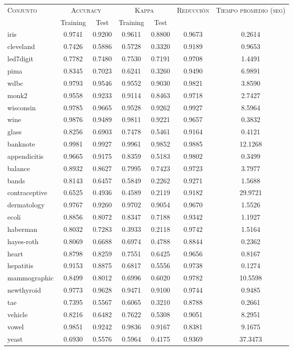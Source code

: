 \begin{table}[]
\centering
\begin{tabular}{l c c c c c c}
\hline
\multirow{2}{*}{\textsc{Conjunto}}
	& \multicolumn{2}{c}{\textsc{Accuracy}}
	& \multicolumn{2}{c}{\textsc{Kappa}}
	& \textsc{Reducción}
	& \textsc{Tiempo promedio (seg)} \\
	& Training & Test
	& Training & Test \\ 
\hline
\hline

iris & 0.9741 & 0.9200 & 0.9611 & 0.8800 & 0.9673 & 0.2614 \\
cleveland & 0.7426 & 0.5886 & 0.5728 & 0.3320 & 0.9189 & 0.9653 \\
led7digit & 0.7782 & 0.7480 & 0.7530 & 0.7191 & 0.9708 & 1.4491 \\
pima & 0.8345 & 0.7023 & 0.6241 & 0.3260 & 0.9490 & 6.9891 \\
wdbc & 0.9793 & 0.9546 & 0.9552 & 0.9030 & 0.9821 & 3.8590 \\
monk2 & 0.9558 & 0.9233 & 0.9114 & 0.8463 & 0.9718 & 2.7427 \\
wisconsin & 0.9785 & 0.9665 & 0.9528 & 0.9262 & 0.9927 & 8.5964 \\
wine & 0.9876 & 0.9489 & 0.9811 & 0.9221 & 0.9657 & 0.3832 \\
glass & 0.8256 & 0.6903 & 0.7478 & 0.5461 & 0.9164 & 0.4121 \\
banknote & 0.9981 & 0.9927 & 0.9961 & 0.9852 & 0.9885 & 12.1268 \\
appendicitis & 0.9665 & 0.9175 & 0.8359 & 0.5183 & 0.9802 & 0.3499 \\
balance & 0.8932 & 0.8627 & 0.7995 & 0.7423 & 0.9723 & 3.7977 \\
bands & 0.8143 & 0.6457 & 0.5849 & 0.2262 & 0.9271 & 1.5688 \\
contraceptive & 0.6525 & 0.4936 & 0.4589 & 0.2119 & 0.9182 & 29.9721 \\
dermatology & 0.9767 & 0.9260 & 0.9702 & 0.9054 & 0.9670 & 1.5526 \\
ecoli & 0.8856 & 0.8072 & 0.8347 & 0.7188 & 0.9342 & 1.1927 \\
haberman & 0.8032 & 0.7283 & 0.3933 & 0.2118 & 0.9742 & 1.5164 \\
hayes-roth & 0.8069 & 0.6688 & 0.6974 & 0.4788 & 0.8844 & 0.2362 \\
heart & 0.8798 & 0.8259 & 0.7551 & 0.6425 & 0.9656 & 0.8167 \\
hepatitis & 0.9153 & 0.8875 & 0.6817 & 0.5556 & 0.9738 & 0.1274 \\
mammographic & 0.8499 & 0.8012 & 0.6996 & 0.6020 & 0.9782 & 10.5598 \\
newthyroid & 0.9773 & 0.9628 & 0.9471 & 0.9100 & 0.9744 & 0.9485 \\
tae & 0.7395 & 0.5567 & 0.6065 & 0.3210 & 0.8788 & 0.2661 \\
vehicle & 0.8216 & 0.6482 & 0.7622 & 0.5308 & 0.9051 & 8.2951 \\
vowel & 0.9851 & 0.9242 & 0.9836 & 0.9167 & 0.8381 & 9.1675 \\
yeast & 0.6930 & 0.5576 & 0.5964 & 0.4175 & 0.9369 & 37.3473 \\


\end{tabular}
\end{table}
